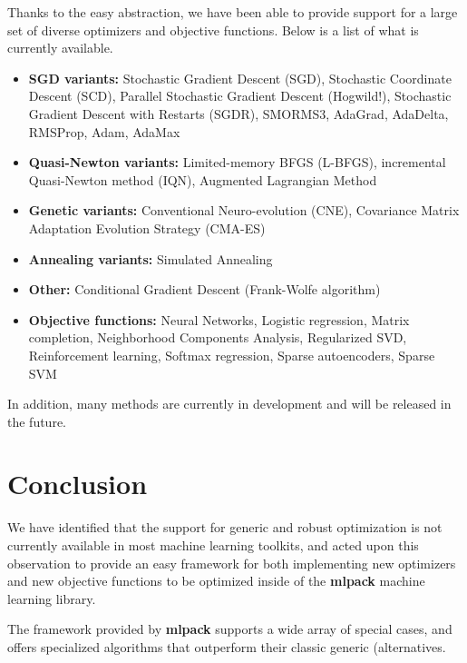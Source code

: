 \documentclass{article}
\begin{document}
Thanks to the easy abstraction, we have been able to provide support for a large
set of diverse optimizers and objective functions.  Below is a list of what is
currently available.

\begin{itemize}
  \item {\bf SGD variants:} Stochastic Gradient Descent (SGD), Stochastic
      Coordinate Descent (SCD), Parallel Stochastic Gradient Descent (Hogwild!),
      Stochastic Gradient Descent with Restarts (SGDR), SMORMS3, AdaGrad,
      AdaDelta, RMSProp, Adam, AdaMax

  \item {\bf Quasi-Newton variants:} Limited-memory BFGS (L-BFGS), incremental
        Quasi-Newton method (IQN), Augmented Lagrangian Method

  \item {\bf Genetic variants:} Conventional Neuro-evolution (CNE), Covariance
        Matrix Adaptation Evolution Strategy (CMA-ES)

  \item {\bf Annealing variants:} Simulated Annealing

  \item {\bf Other:} Conditional Gradient Descent (Frank-Wolfe algorithm)

  \item {\bf Objective functions:} Neural Networks, Logistic regression,
      Matrix completion, Neighborhood Components Analysis, Regularized SVD,
      Reinforcement learning, Softmax regression, Sparse autoencoders,
      Sparse SVM
\end{itemize}

In addition, many methods are currently in development and will be released in
the future.

\section{Conclusion}

We have identified that the support for generic and robust optimization is not
currently available in most machine learning toolkits, and acted upon this
observation to provide an easy framework for both implementing new optimizers
and new objective functions to be optimized inside of the {\bf mlpack} machine
learning library.

The framework provided by {\bf mlpack} supports a wide array of special cases,
and offers specialized algorithms that outperform their classic generic
 (alternatives.



\end{document}
